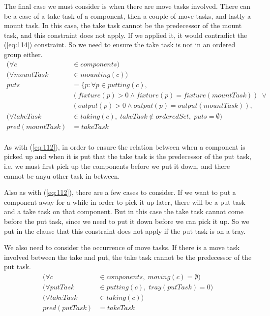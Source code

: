  The final case we must consider is when there are move tasks involved. There can be a case of a take task of a component, then a couple of move tasks, and lastly a mount task. In this case, the take task cannot be the predecessor of the mount task, and this constraint does not apply. If we applied it, it would contradict the (\ref{eq:114}) constraint. So we need to ensure the take task is not in an ordered group either.
 \begin{equation}
 \begin{aligned}\label{eq:112}
 (\forall c &\in components) \\
 (\forall mountTask &\in mounting(c)) \\
 puts &= \{p : \forall p \in putting(c),\\
 &(fixture(p) > 0 \land fixture(p) = fixture(mountTask)) \; \lor  \\
 &(output(p) > 0 \land output(p) = output(mountTask)), \\
 (\forall takeTask &\in taking(c), \; takeTask \notin orderedSet, \; puts = \emptyset) \\
 pred(mountTask) &= takeTask \\
 \end{aligned}
 \end{equation}

  \noindent As with (\ref{eq:112}), in order to ensure the relation between when a component is picked up and when it is put that the take task is the predecessor of the put task, i.e. we must first pick up the components before we put it down, and there cannot be anyu other task in between.
  
  Also as with (\ref{eq:112}), there are a few cases to consider. If we want to put a component away for a while in order to pick it up later, there will be a put task and a take task on that component. But in this case the take task cannot come before the put task, since we need to put it down before we can pick it up. So we put in the clause that this constraint does not apply if the put task is on a tray.
  
  We also need to consider the occurrence of move tasks. If there is a move task involved between the take and put, the take task cannot be the predecessor of the put task.
 \begin{equation}
 \begin{aligned}\label{eq:113}
 (\forall c &\in components, \; moving(c) = \emptyset)\\
 (\forall putTask &\in putting(c), \; tray(putTask) = 0)\\
 (\forall takeTask &\in taking(c))\\
 pred(putTask) &= takeTask
 \end{aligned}
 \end{equation}

